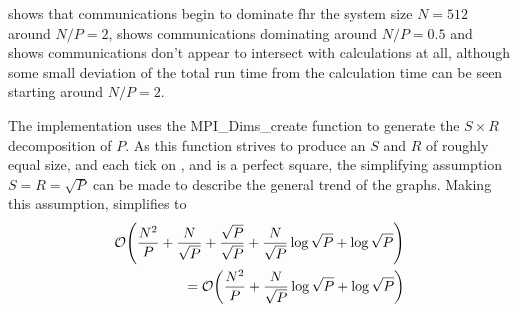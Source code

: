 %
%
\begin{figure}[!h]
    
    \caption{}
    \label{fig:v1_replicated_systolic_pair_operation_512_logtime}
\end  {figure}

\begin{figure}[!h]
    
    \caption{}
    \label{fig:v1_replicated_systolic_pair_operation_4096_logtime}
\end  {figure}

\begin{figure}[!h]
    
    \caption{}
    \label{fig:v1_replicated_systolic_pair_operation_32768_logtime}
\end  {figure}

\vZeroTimeExplanation
    {}
    {}
    {}
    {\individualoperation{}}
    {\replicatedsystolicloop{}}


 shows that
communications begin to dominate fhr the system size $N = 512$ around
$N/P = 2$,
 shows
communications dominating around $N/P = 0.5$ and
 shows
communications don't appear to intersect with calculations at all,
although some small deviation of the total run time from the calculation
time can be seen starting around $N/P = 2$.

The implementation uses the MPI\_Dims\_create function to generate
the $S\times{}R$ decomposition of $P$.
%
As this function strives to
produce an $S$ and $R$ of roughly equal size, and each tick on
,
 and
is a perfect square, the simplifying assumption $S = R = \sqrt{P}$
can be made to describe the general trend of the graphs.
%
Making this assumption,
simplifies to
\begin{equation}
    \label{eqn:replicated_systolic_pair_operation_simplified_time}
    \begin{split}
        \mathcal{O}{\left({ 
            \frac{N^2}{P}
            + \frac{N}{\sqrt{P}}
            + \frac{\sqrt{P}}{\sqrt{P}}
            + \frac{N}{\sqrt{P}}\log{\sqrt{P}}
            + \log{\sqrt{P}}
         }\right)} \\
        = \mathcal{O}{\left({ 
            \frac{N^2}{P}
            + \frac{N}{\sqrt{P}}\log{\sqrt{P}}
            + \log{\sqrt{P}}
         }\right)}
    \end{split}
\end{equation}
